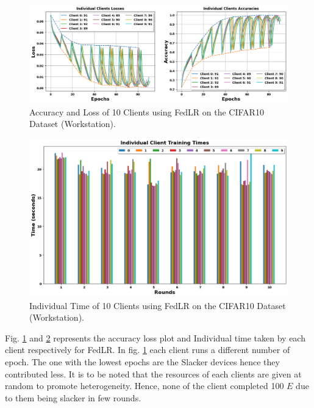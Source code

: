 \documentclass[conference]{IEEEtran}
\begin{document}
%

\begin{figure}[htp!]
	\centering
	\includegraphics[scale=.28]{Images/NEWGRAPHS/1.png}
	\caption{Accuracy and Loss of 10 Clients using FedLR on the CIFAR10 Dataset (Workstation).}
	\label{FedLRC10}
\end{figure}

\begin{figure}[htp!]
	\centering
	\includegraphics[scale=.3]{Images/NEWGRAPHS/2.png}
	\caption{Individual Time of 10 Clients using FedLR on the CIFAR10 Dataset (Workstation).}
	\label{FedLRTimeC10}


\end{figure}
Fig. \ref{FedLRC10} and \ref{FedLRTimeC10} represents the accuracy loss plot and Individual time taken by each client respectively for FedLR. In fig. \ref{FedLRC10} each client runs a different number of epoch. The one with the lowest epochs are the Slacker devices hence they contributed less. It is to be noted that the resources of each clients are given at random to promote heterogeneity. Hence, none of the client completed 100 $E$ due to them being slacker in few rounds.
\end{document}
